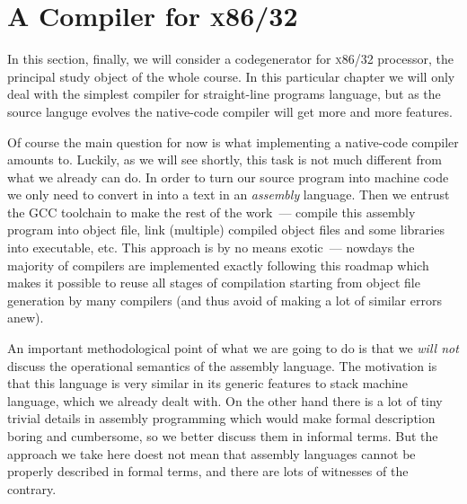 \chapter{A Compiler for \textsc{x86/32}}

In this section, finally, we will consider a codegenerator for \textsc{x86/32} processor, the principal study object of the whole course. In this particular chapter we will only deal with the simplest compiler for straight-line programs language, but as the source languge evolves the native-code compiler will get more and more features.

Of course the main question for now is what implementing a native-code compiler amounts to. Luckily, as we will see shortly, this task is not much different from what we already can do. In order to turn our source program into machine code we only need to convert in into a text in an \emph{assembly} language. Then we entrust the \textsc{GCC} toolchain to make the rest of the work~--- compile this assembly program into object file, link (multiple) compiled object files and some libraries into executable, etc. This approach is by no means exotic~--- nowdays the majority of compilers are implemented exactly following this roadmap which makes it possible to reuse all stages of compilation starting from object file generation by many compilers (and thus avoid of making a lot of similar errors anew).

An important methodological point of what we are going to do is that we \emph{will not} discuss the operational semantics of the assembly language. The motivation is that this language is very similar in its generic features to stack machine language, which we already dealt with. On the other hand there is a lot of tiny trivial details in assembly programming which would make formal description boring and cumbersome, so we better discuss them in informal terms. But the approach we take here doest not mean that assembly languages cannot be properly described in formal terms, and there are lots of witnesses of the contrary.


